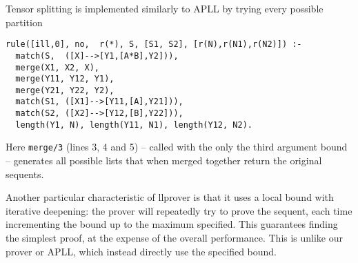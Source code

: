 Tensor splitting is implemented similarly to APLL by trying every possible partition
\begin{verbatim}
rule([ill,0], no,  r(*), S, [S1, S2], [r(N),r(N1),r(N2)]) :-
  match(S,  ([X]-->[Y1,[A*B],Y2])),
  merge(X1, X2, X),
  merge(Y11, Y12, Y1),
  merge(Y21, Y22, Y2),
  match(S1, ([X1]-->[Y11,[A],Y21])),
  match(S2, ([X2]-->[Y12,[B],Y22])),
  length(Y1, N), length(Y11, N1), length(Y12, N2).
\end{verbatim}
Here \texttt{merge/3} (lines 3, 4 and 5) -- called with the only the third argument bound -- generates all possible lists that when merged together return the original sequents.

Another particular characteristic of llprover is that it uses a local bound with iterative deepening: the prover will repeatedly try to prove the sequent, each time incrementing the bound up to the maximum specified.
This guarantees finding the simplest proof, at the expense of the overall performance.
This is unlike our prover or APLL, which instead directly use the specified bound.


